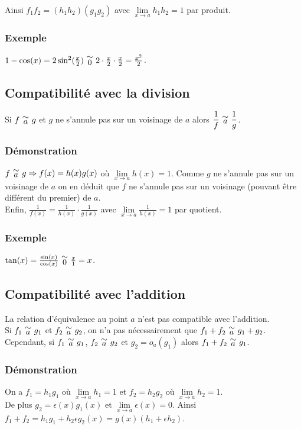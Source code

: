 \documentclass[a4paper,10pt]{book} %
\newcommand{\equi}[1]{\renewcommand{\arraystretch}{0.3}~\begin{matrix}\sim\\#1\end{matrix}~\renewcommand{\arraystretch}{1}}
\begin{document}
Ainsi $f_1f_2=(h_1h_2)(g_1g_2)$ avec $\lim\limits_{x\rightarrow a}h_1h_2=1$ par produit.

\subsubsection{Exemple}
$1-\cos(x)=2\sin^2(\frac{x}{2}) \equi{0} 2\cdot \frac{x}{2}\cdot \frac{x}{2}=\frac{x^2}{2}$.

\subsection{Compatibilité avec la division}
Si $f \equi{a} g$ et $g$ ne s'annule pas sur un voisinage de $a$ alors $\displaystyle\frac{1}{f} \equi{a} \frac{1}{g}$.

\subsubsection{Démonstration}
$f \equi{a} g \Rightarrow f(x)=h(x)g(x)$ où $\lim\limits_{x\rightarrow a}h(x)=1$. Comme $g$ ne s'annule pas sur un voisinage de $a$ on en déduit que $f$ ne s'annule pas sur un voisinage (pouvant être différent du premier) de $a$.\\

Enfin, $\frac{1}{f(x)}=\frac{1}{h(x)}\cdot \frac{1}{g(x)}$ avec $\lim\limits_{x\rightarrow a}\frac{1}{h(x)}=1$ par quotient.

\subsubsection{Exemple}
$\tan(x)=\frac{\sin(x)}{\cos(x)} \equi{0} \frac{x}{1}=x$.

\subsection{Compatibilité avec l'addition}
La relation d'équivalence au point $a$ n'est pas compatible avec l'addition.\\
Si $f_1 \equi{a} g_1$ et $f_2 \equi{a} g_2$, on n'a pas nécessairement que $f_1+f_2\equi{a} g_1+g_2$.\\

Cependant, si $f_1 \equi{a} g_1$, $f_2 \equi{a} g_2$ et $g_2=o_a(g_1)$ alors $f_1+f_2 \equi{a} g_1$.

\subsubsection{Démonstration}
On a $f_1=h_1g_1$ où $\lim\limits_{x\rightarrow a}h_1=1$ et $f_2=h_2g_2$ où $\lim\limits_{x\rightarrow a}h_2=1$.\\
De plus $g_2=\epsilon(x)g_1(x)$ et $\lim\limits_{x\rightarrow a}\epsilon(x)=0$. Ainsi $f_1+f_2=h_1g_1+h_2\epsilon g_2(x)=g(x)(h_1+\epsilon h_2)$.
\end{document}
